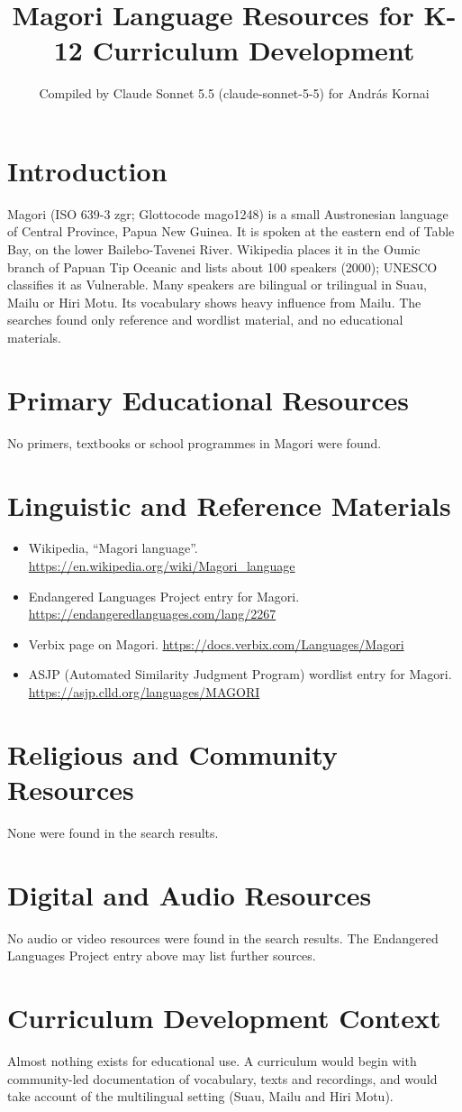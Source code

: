 \documentclass[12pt]{article}
\title{Magori Language Resources for K-12 Curriculum Development}
\author{Compiled by Claude Sonnet 5.5 (claude-sonnet-5-5) for Andr\'as Kornai}
\date{}
\begin{document}
\maketitle

\section{Introduction}
Magori (ISO 639-3 zgr; Glottocode mago1248) is a small Austronesian language of Central Province, Papua New Guinea. It is spoken at the eastern end of Table Bay, on the lower Bailebo-Tavenei River. Wikipedia places it in the Oumic branch of Papuan Tip Oceanic and lists about 100 speakers (2000); UNESCO classifies it as Vulnerable. Many speakers are bilingual or trilingual in Suau, Mailu or Hiri Motu. Its vocabulary shows heavy influence from Mailu. The searches found only reference and wordlist material, and no educational materials.

\section{Primary Educational Resources}
No primers, textbooks or school programmes in Magori were found.

\section{Linguistic and Reference Materials}
\begin{itemize}
\item Wikipedia, ``Magori language''. \url{https://en.wikipedia.org/wiki/Magori_language}
\item Endangered Languages Project entry for Magori. \url{https://endangeredlanguages.com/lang/2267}
\item Verbix page on Magori. \url{https://docs.verbix.com/Languages/Magori}
\item ASJP (Automated Similarity Judgment Program) wordlist entry for Magori. \url{https://asjp.clld.org/languages/MAGORI}
\end{itemize}

\section{Religious and Community Resources}
None were found in the search results.

\section{Digital and Audio Resources}
No audio or video resources were found in the search results. The Endangered Languages Project entry above may list further sources.

\section{Curriculum Development Context}
Almost nothing exists for educational use. A curriculum would begin with community-led documentation of vocabulary, texts and recordings, and would take account of the multilingual setting (Suau, Mailu and Hiri Motu).
\end{document}
